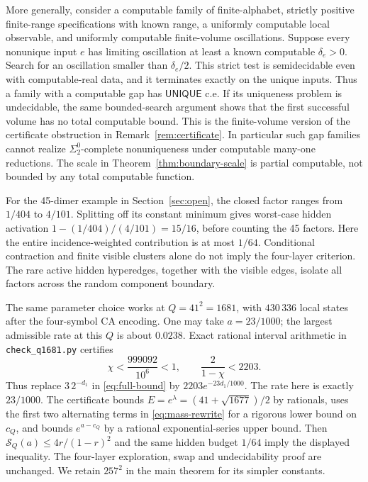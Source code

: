 \begin{remark}\label{rem:gap-ce}
More generally, consider a computable family of finite-alphabet, strictly positive finite-range specifications with known range, a uniformly computable local observable, and uniformly computable finite-volume oscillations. Suppose every nonunique input $e$ has limiting oscillation at least a known computable $\delta_e>0$. Search for an oscillation smaller than $\delta_e/2$. This strict test is semidecidable even with computable-real data, and it terminates exactly on the unique inputs. Thus a family with a computable gap has $\mathsf{UNIQUE}$ c.e. If its uniqueness problem is undecidable, the same bounded-search argument shows that the first successful volume has no total computable bound. This is the finite-volume version of the certificate obstruction in Remark~\ref{rem:certificate}. In particular such gap families cannot realize $\Sigma^0_2$-complete nonuniqueness under computable many-one reductions. The scale in Theorem~\ref{thm:boundary-scale} is partial computable, not bounded by any total computable function.
\end{remark}

\begin{remark}
For the 45-dimer example in Section~\ref{sec:open}, the closed factor ranges from $1/404$ to $4/101$. Splitting off its constant minimum gives worst-case hidden activation $1-(1/404)/(4/101)=15/16$, before counting the 45 factors. Here the entire incidence-weighted contribution is at most $1/64$. Conditional contraction and finite visible clusters alone do not imply the four-layer criterion. The rare active hidden hyperedges, together with the visible edges, isolate all factors across the random component boundary.
\end{remark}


\begin{remark}\label{rem:q1681}
The same parameter choice works at $Q=41^2=1681$, with $430\,336$ local states after the four-symbol CA encoding. One may take $a=23/1000$; the largest admissible rate at this $Q$ is about $0.0238$. Exact rational interval arithmetic in \texttt{check\_q1681.py} certifies
\[
 \chi<\frac{999092}{10^6}<1,\qquad \frac2{1-\chi}<2203.
\]
Thus replace $3\,2^{-d_1}$ in \eqref{eq:full-bound} by $2203e^{-23d_1/1000}$. The rate here is exactly $23/1000$. The certificate bounds $E=e^\lambda=(41+\sqrt{1677})/2$ by rationals, uses the first two alternating terms in \eqref{eq:mass-rewrite} for a rigorous lower bound on $c_Q$, and bounds $e^{a-c_Q}$ by a rational exponential-series upper bound. Then $\mathcal S_Q(a)\le4r/(1-r)^2$ and the same hidden budget $1/64$ imply the displayed inequality. The four-layer exploration, swap and undecidability proof are unchanged. We retain $257^2$ in the main theorem for its simpler constants.
\end{remark}
